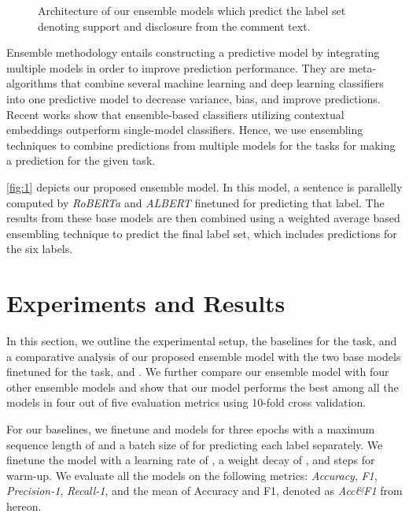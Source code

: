\documentclass[runningheads]{llncs}
\begin{document}
\begin{figure}[!h]
        \caption{\label{fig:1} Architecture of our ensemble models which predict the label set denoting support and disclosure from the comment text.}
\end{figure}

Ensemble methodology entails constructing a predictive model by integrating multiple models in order to improve prediction performance. They are meta-algorithms that combine several machine learning and deep learning classifiers into one predictive model to decrease variance, bias, and improve predictions. Recent works show that ensemble-based classifiers utilizing contextual embeddings outperform single-model classifiers.\cite{2020roberta,2020albert} Hence, we use ensembling techniques to combine predictions from multiple models for the tasks for making a prediction for the given task.

 \autoref{fig:1} depicts our proposed ensemble model. In this model, a sentence is parallelly computed by \textit{RoBERTa} and \textit{ALBERT} finetuned for predicting that label. The results from these base models are then combined using a weighted average based ensembling technique to predict the final label set, which includes predictions for the six labels.

\section{Experiments and Results}

In this section, we outline the experimental setup, the baselines for the task, and a comparative analysis of our proposed ensemble model with the two base models finetuned for the task,  and . We further compare our ensemble model with four other ensemble models and show that our model performs the best among all the models in four out of five evaluation metrics using 10-fold cross validation. 

For our baselines, we finetune  and  models for three epochs with a maximum sequence length of  and a batch size of  for predicting each label separately. We finetune the model with a learning rate of , a weight decay of , and  steps for warm-up. We evaluate all the models on the following metrics: \textit{Accuracy}, \textit{F1}, \textit{Precision-1}, \textit{Recall-1}, and the mean of Accuracy and F1, denoted as \textit{Acc\&F1} from hereon.
\end{document}
